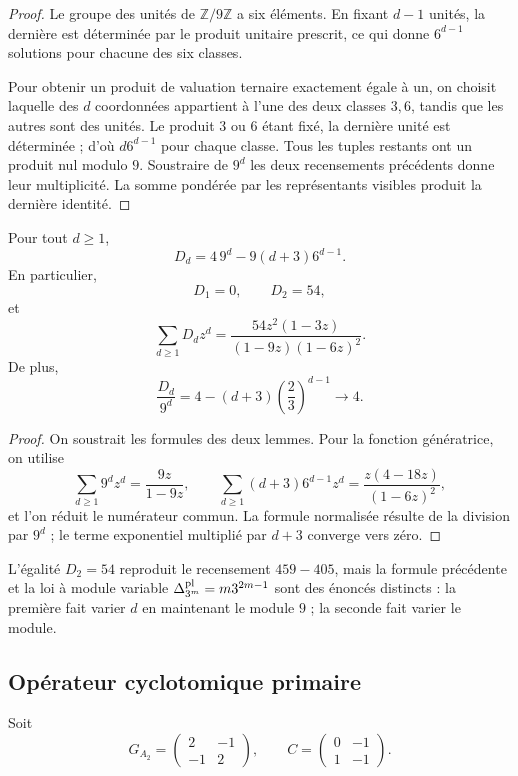 \begin{proof}
Le groupe des unités de \(\mathbb Z/9\mathbb Z\) a six éléments. En
fixant \(d-1\) unités, la dernière est déterminée par le produit
unitaire prescrit, ce qui donne \(6^{d-1}\) solutions pour chacune des
six classes.

Pour obtenir un produit de valuation ternaire exactement égale à un, on choisit laquelle
des \(d\) coordonnées appartient à l’une des deux classes \(3,6\), tandis que
les autres sont des unités. Le produit \(3\) ou \(6\) étant fixé, la dernière unité
est déterminée ; d’où \(d6^{d-1}\) pour chaque classe. Tous les tuples
restants ont un produit nul modulo \(9\). Soustraire de \(9^d\) les deux
recensements précédents donne leur multiplicité. La somme pondérée par les
représentants visibles produit la dernière identité.
\end{proof}

\begin{theorem}
\label{p12-83-c1-s5:thm:ley-dimensional-app-autonoma}
Pour tout \(d\geq1\),
\[
 \boxed{D_d=4\,9^d-9(d+3)6^{d-1}.}
\]
En particulier,
\[
 D_1=0,
 \qquad
 D_2=54,
\]
et
\[
 \sum_{d\geq1}D_dz^d
 =\frac{54z^2(1-3z)}{(1-9z)(1-6z)^2}.
\]
De plus,
\[
 \frac{D_d}{9^d}
 =4-(d+3)\left(\frac23\right)^{d-1}
 \longrightarrow4.
\]
\end{theorem}

\begin{proof}
On soustrait les formules des deux lemmes. Pour la fonction génératrice, on utilise
\[
 \sum_{d\geq1}9^dz^d=\frac{9z}{1-9z},
 \qquad
 \sum_{d\geq1}(d+3)6^{d-1}z^d
 =\frac{z(4-18z)}{(1-6z)^2},
\]
et l’on réduit le numérateur commun. La formule normalisée résulte de la division
par \(9^d\) ; le terme exponentiel multiplié par \(d+3\) converge vers
zéro.
\end{proof}

L’égalité \(D_2=54\) reproduit le recensement \(459-405\), mais la formule
précédente et la loi à module variable
\(\Delta_{3^m}^{\rm pl}=m3^{2m-1}\) sont des énoncés distincts : la première
fait varier \(d\) en maintenant le module \(9\) ; la seconde fait varier le module.

\subsection{Opérateur cyclotomique primaire}

Soit
\[
 G_{A_2}=\begin{pmatrix}2&-1\\-1&2\end{pmatrix},
 \qquad
 C=\begin{pmatrix}0&-1\\1&-1\end{pmatrix}.
\]

